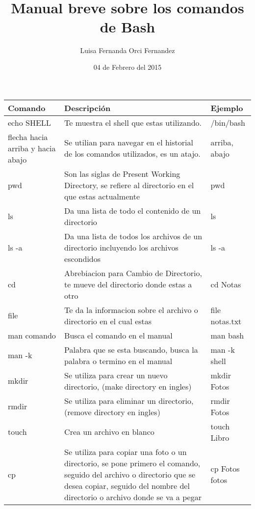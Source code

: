 \documentclass[12pt]{article}
\title{Manual breve sobre los comandos de Bash}
\author{Luisa Fernanda Orci Fernandez}
\date{04 de Febrero del 2015}
\begin{document}
\maketitle
\begin{longtable}{|p{1 in}|p{3.0 in}|p{2 in}|}
\hline
Comando & Descripci\'on & Ejemplo \\
\hline
echo SHELL & Te muestra el shell que estas utilizando. & /bin/bash \\
flecha hacia arriba y hacia abajo & Se utilian para navegar en el historial de los comandos utilizados, es un atajo. & arriba, abajo \\

pwd & Son las siglas de Present Working Directory, se refiere al directorio en el que estas actualmente & pwd \\

ls & Da una lista de todo el contenido de un directorio & ls \\

ls -a & Da una lista de todos los archivos de un directorio incluyendo los archivos escondidos & ls -a \\

cd & Abrebiacion para Cambio de Directorio, te mueve del directorio donde estas a otro & cd Notas \\

file & Te da la informacion sobre el archivo o directorio en el cual estas & file notas.txt \\

man comando & Busca el comando en el manual & man bash \\

man -k & Palabra que se esta buscando, busca la palabra o termino en el manual & man -k shell \\

mkdir & Se utiliza para crear un nuevo directorio, (make directory en ingles) & mkdir Fotos \\

rmdir & Se utiliza para eliminar un directorio, (remove directory en ingles) & rmdir Fotos \\

touch & Crea un archivo en blanco & touch Libro \\

cp & Se utiliza para copiar una foto o un directorio, se pone primero el comando, seguido del archivo o directorio que se desea copiar, seguido del nombre del directorio o archivo donde se va a pegar & cp Fotos fotos \\


\end{longtable}
\end{document}

